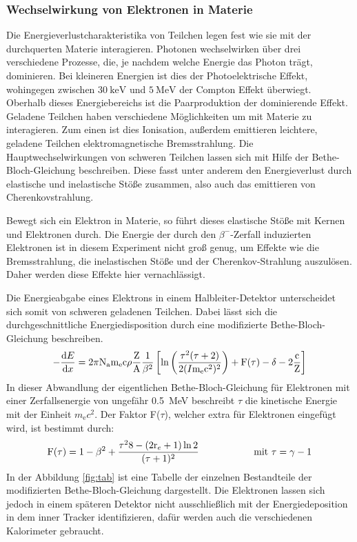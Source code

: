 \subsubsection{Wechselwirkung von Elektronen in Materie}
Die Energieverlustcharakteristika von Teilchen legen fest wie sie mit der durchquerten Materie interagieren. Photonen wechselwirken über drei verschiedene Prozesse, die, je nachdem welche Energie das Photon trägt, dominieren. Bei kleineren Energien ist dies der Photoelektrische Effekt, wohingegen zwischen $\SI{30}{\kilo\electronvolt}$ und $\SI{5}{\mega\electronvolt}$ der Compton Effekt überwiegt. Oberhalb dieses Energiebereichs ist die Paarproduktion der dominierende Effekt. Geladene Teilchen haben verschiedene Möglichkeiten um mit Materie zu interagieren. Zum einen ist dies Ionisation, außerdem emittieren leichtere, geladene Teilchen elektromagnetische Bremsstrahlung. Die Hauptwechselwirkungen von schweren Teilchen lassen sich mit Hilfe der Bethe-Bloch-Gleichung beschreiben. Diese fasst unter anderem den Energieverlust durch elastische und inelastische Stöße zusammen, also auch das emittieren von Cherenkovstrahlung.

Bewegt sich ein Elektron in Materie, so führt dieses elastische Stöße mit Kernen und Elektronen durch. Die Energie der durch den $\beta^{-}$-Zerfall induzierten Elektronen ist in diesem Experiment nicht groß genug, um Effekte wie die Bremsstrahlung, die inelastischen Stöße und der Cherenkov-Strahlung auszulösen. Daher werden diese Effekte hier vernachlässigt.

Die Energieabgabe eines Elektrons in einem Halbleiter-Detektor unterscheidet sich somit von schweren geladenen Teilchen. Dabei lässt sich die durchgeschnittliche Energiedisposition durch eine modifizierte Bethe-Bloch-Gleichung beschreiben.
\begin{equation*}
  -\frac{\text{d}E}{\text{d}x} =
  2\pi \text{N}_\text{a} \text{m}_\text{e} \text{c}\rho \frac{\text{Z}}{\text{A}}\frac{1}{\beta^2}
  \left[\text{ln}\left(\frac{\tau^2(\tau + 2)}{2(I\/\text{m}_\text{e}\text{c}^2)^2}\right)
  + \text{F}(\tau) - \delta - 2\frac{\text{c}}{\text{Z}}\right]
	\label{eq:12}
\end{equation*}
In dieser Abwandlung der eigentlichen Bethe-Bloch-Gleichung für Elektronen mit einer Zerfallsenergie von ungefähr \SI{0.5}{\mega\electronvolt} beschreibt $\tau$ die kinetische Energie mit der Einheit $m_\text{e} c^2$. Der Faktor F($\tau$), welcher extra für Elektronen eingefügt wird, ist bestimmt durch:
\begin{equation*}
  \text{F}(\tau) = 1 - \beta^2 + \frac{\tau^2\/8 - (2\text{r}_e + 1) \ln2}{(\tau + 1)^2}
  \hspace{2cm}\text{mit } \tau = \gamma - 1
\end{equation*}
In der Abbildung \ref{fig:tab} ist eine Tabelle der einzelnen Bestandteile der modifizierten Bethe-Bloch-Gleichung dargestellt. Die Elektronen lassen sich jedoch in einem späteren Detektor nicht ausschließlich mit der Energiedeposition in dem inner Tracker identifizieren, dafür werden auch die verschiedenen Kalorimeter gebraucht.

